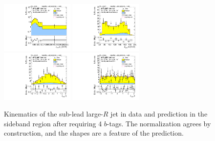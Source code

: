 \begin{figure}[htbp!]
\begin{center}
\includegraphics[width=0.32\textwidth,angle=-90]{figures/boosted/Sideband/b77_FourTag_Sideband_sublHCand_Pt_m_1.pdf}
\includegraphics[width=0.32\textwidth,angle=-90]{figures/boosted/Sideband/b77_FourTag_Sideband_sublHCand_Mass_s.pdf}\\
\includegraphics[width=0.32\textwidth,angle=-90]{figures/boosted/Sideband/b77_FourTag_Sideband_sublHCand_Eta.pdf}
\includegraphics[width=0.32\textwidth,angle=-90]{figures/boosted/Sideband/b77_FourTag_Sideband_sublHCand_Phi.pdf}
  \caption{Kinematics of the sub-lead large-$R$ jet in data and prediction in the sideband region after requiring 4 $b$-tags. The normalization agrees by construction, and the shapes are a feature of the prediction.}
  \label{fig:boosted-4b-sideband-ak10-subl}
\end{center}
\end{figure}

